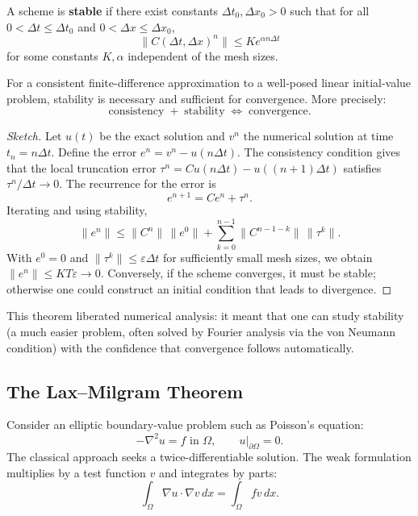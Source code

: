 \begin{definition}[Stability]
A scheme is \textbf{stable} if there exist constants \(\Delta t_0, \Delta x_0 > 0\) such that for all \(0 < \Delta t \leq \Delta t_0\) and \(0 < \Delta x \leq \Delta x_0\),
\[
\|C(\Delta t, \Delta x)^n\| \leq K e^{\alpha n \Delta t}
\]
for some constants \(K, \alpha\) independent of the mesh sizes.
\end{definition}

\begin{theorem}
For a consistent finite-difference approximation to a well-posed linear initial-value problem, stability is necessary and sufficient for convergence. More precisely:
\[
\text{consistency} \;+\; \text{stability} \;\Longleftrightarrow\; \text{convergence}.
\]
\end{theorem}

\begin{proof}[Sketch]
Let \(u(t)\) be the exact solution and \(v^n\) the numerical solution at time \(t_n = n \Delta t\). Define the error \(e^n = v^n - u(n\Delta t)\). The consistency condition gives that the local truncation error \(\tau^n = C u(n\Delta t) - u((n+1)\Delta t)\) satisfies \(\tau^n / \Delta t \to 0\). The recurrence for the error is
\[
e^{n+1} = C e^n + \tau^n.
\]
Iterating and using stability,
\[
\|e^n\| \leq \|C^n\|\,\|e^0\| + \sum_{k=0}^{n-1} \|C^{n-1-k}\|\,\|\tau^k\|.
\]
With \(e^0 = 0\) and \(\|\tau^k\| \leq \varepsilon \Delta t\) for sufficiently small mesh sizes, we obtain \(\|e^n\| \leq K T \varepsilon \to 0\). Conversely, if the scheme converges, it must be stable; otherwise one could construct an initial condition that leads to divergence.
\end{proof}

This theorem liberated numerical analysis: it meant that one can study stability (a much easier problem, often solved by Fourier analysis via the von Neumann condition) with the confidence that convergence follows automatically.

\subsection{The Lax--Milgram Theorem}

Consider an elliptic boundary-value problem such as Poisson's equation:
\[
-\nabla^2 u = f \text{ in } \Omega, \qquad u|_{\partial\Omega} = 0.
\]
The classical approach seeks a twice-differentiable solution. The weak formulation multiplies by a test function \(v\) and integrates by parts:
\[
\int_\Omega \nabla u \cdot \nabla v \,dx = \int_\Omega f v \,dx.
\]

